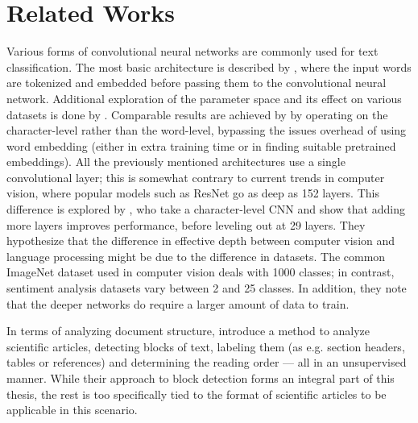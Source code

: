 \chapter{Related Works}

Various forms of convolutional neural networks are commonly used for text
classification. The most basic architecture is described by
\textcite{kim2014conv}, where the input words are tokenized and embedded before
passing them to the convolutional neural network. Additional exploration of the
parameter space and its effect on various datasets is done by
\textcite{zhang2015conv}. Comparable results are achieved by
\textcite{zhang2015character} by operating on the character-level rather than
the word-level, bypassing the issues overhead of using word embedding (either in
extra training time or in finding suitable pretrained embeddings). All the
previously mentioned architectures use a single convolutional layer; this is
somewhat contrary to current trends in computer vision, where popular models
such as ResNet\citep{resnet2015} go as deep as 152 layers. This difference is
explored by \textcite{Conneau2016ldeep}, who take a character-level CNN and show
that adding more layers improves performance, before leveling out at 29 layers.
They hypothesize that the difference in effective depth between computer vision
and language processing might be due to the difference in datasets. The common
ImageNet dataset used in computer vision deals with 1000 classes; in contrast,
sentiment analysis datasets vary between 2 and 25 classes. In addition, they
note that the deeper networks do require a larger amount of data to train.

In terms of analyzing document structure, \textcite{klampfl2014unsupervised}
introduce a method to analyze scientific articles, detecting blocks of text,
labeling them (as e.g. section headers, tables or references) and determining
the reading order --- all in an unsupervised manner. While their approach to
block detection forms an integral part of this thesis, the rest is too
specifically tied to the format of scientific articles to be applicable in this
scenario.

